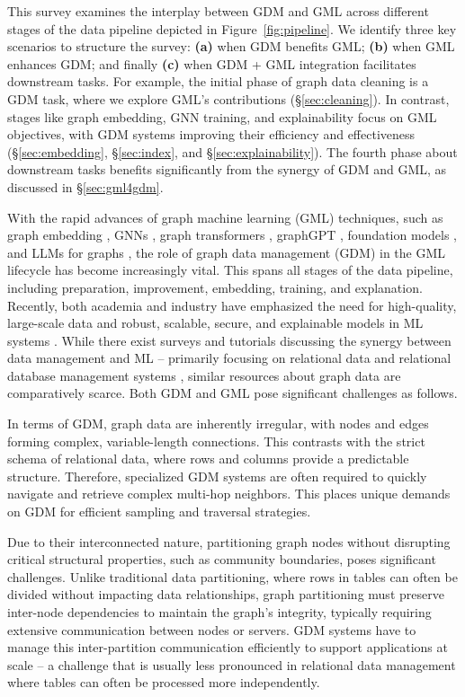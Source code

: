 \documentclass{sig-alternate-10pt}
\newcommand{\spara}[1]{\smallskip\noindent{\bf #1}}
\begin{document}
This survey examines the interplay between GDM and GML across different stages of the data pipeline depicted in Figure~\ref{fig:pipeline}.
We identify three key scenarios to structure the survey:
{\bf (a)} when GDM benefits GML; {\bf (b)} when GML enhances GDM; and finally {\bf (c)} when GDM + GML integration facilitates downstream tasks.
For example, the initial phase of graph data cleaning is a GDM task, where we explore GML's contributions (\S \ref{sec:cleaning}).
In contrast, stages like graph embedding, GNN training, and explainability focus on GML objectives, with GDM systems improving their efficiency and effectiveness (\S \ref{sec:embedding}, \S \ref{sec:index}, and \S \ref{sec:explainability}).
The fourth phase about downstream tasks benefits significantly from the synergy of GDM and GML, as discussed in \S \ref{sec:gml4gdm}.


\spara{Motivation: What are new in GDM and GML?}
With the rapid advances of graph machine learning (GML) techniques, such as graph embedding \cite{00010YAWP021}, GNNs \cite{WuPCLZY21,ZhangCZ22,ma2021deep}, graph transformers \cite{abs-2202-08455}, graphGPT \cite{abs-2310-13023}, foundation models \cite{abs-2310-11829}, and LLMs for graphs \cite{jin2023large, abs-2311-12399}, the role of graph data management (GDM) in the GML lifecycle has become increasingly vital.
This spans all stages of the data pipeline, including preparation, improvement, embedding, training, and explanation.
Recently, both academia and industry have emphasized the need for high-quality, large-scale data and robust, scalable, secure, and explainable models in ML systems \cite{Polyzotis0WZ17,abs-2309-10979}.
While there exist surveys and tutorials
discussing the synergy between data management and ML -- primarily focusing on
relational data and relational database management systems \cite{ChaiWLNL23,
Kumar0017,Polyzotis0WZ17}, similar resources about graph data are comparatively scarce.
Both GDM and GML pose significant challenges as follows.

In terms of GDM, graph data are inherently irregular, with nodes and edges forming complex, variable-length connections. This contrasts with the strict schema of relational data, where rows and columns provide a predictable structure.
Therefore, specialized GDM systems are often required to quickly navigate and retrieve complex multi-hop neighbors.
This places unique demands on GDM for efficient sampling and traversal strategies.


Due to their interconnected nature, partitioning graph nodes without disrupting critical structural properties, such as community boundaries, poses significant challenges.
Unlike traditional data partitioning, where rows in tables can often be divided without impacting data relationships, graph partitioning must preserve inter-node dependencies to maintain the graph's integrity, typically requiring extensive communication between nodes or servers.
GDM systems have to manage this inter-partition communication efficiently to support applications at scale -- a challenge that is usually less pronounced in relational data management where tables can often be processed more independently.
\end{document}
